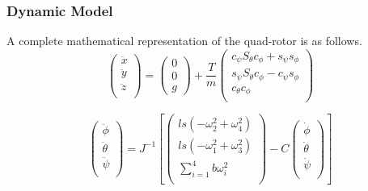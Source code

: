 \documentclass{beamer}
\begin{document}
\begin{frame}
\frametitle{Dynamic Model}
A complete mathematical representation of the quad-rotor is as follows.\\

\begin{equation}
    \label{lineareq}
    \left(
        \begin{array}{c}
           \ddot{x}\\
           \ddot{y}\\
           \ddot{z}\\
        \end{array}
    \right)
    = \left(
       \begin{array}{c}
        0\\
        0\\
        g
      \end{array}
    \right)
    +\frac{T}{m}
     \left(
        \begin{array}{c}
             c_{\psi}S_{\theta}c_{\phi} + s_{\psi}s_{\phi} \\
             s_{\psi}S_{\theta}c_{\phi} - c_{\psi}s_{\phi} \\
             c_{\theta} c_{\phi} \\
        \end{array}
    \right)
\end{equation}

\begin{equation}
    \label{angulareq}
    \left(
        \begin{array}{c}
           \ddot{\phi}\\
           \ddot{\theta}\\
           \ddot{\psi}\\
        \end{array}
    \right) = J^{-1}
    \left[ \left(
        \begin{array}{c}
            l s (-\omega_2^2 + \omega_4^2)\\
            l s (-\omega_1^2 + \omega_3^2)\\
            \sum \limits_{i=1}^4 b \omega_i^2\\
        \end{array}
    \right) -
    C
    \left(
        \begin{array}{c}
           \dot{\phi}\\
           \dot{\theta}\\
           \dot{\psi}\\
        \end{array}
    \right)
    \right]
\end{equation}

\end{frame}
\end{document}
